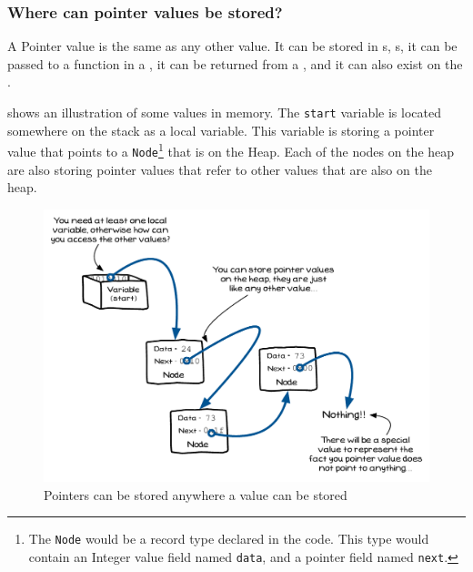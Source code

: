 
\clearpage
\subsubsection{Where can pointer values be stored?} %
\label{ssub:where_can_pointer_values_be_stored_}

A Pointer value is the same as any other value. It can be stored in s, s, it can be passed to a function in a , it can be returned from a , and it can also exist on the .

 shows an illustration of some values in memory. The \texttt{start} variable is located somewhere on the stack as a local variable.  This variable is storing a pointer value that points to a \texttt{Node}\footnote{The \texttt{Node} would be a record type declared in the code. This type would contain an Integer value field named \texttt{data}, and a pointer field named \texttt{next}.} that is on the Heap. Each of the nodes on the heap are also storing pointer values that refer to other values that are also on the heap.

\begin{figure}[h]
   \centering
   \includegraphics[width=\textwidth]{./topics/dynamic-memory/diagrams/PointerValues} 
   \caption{Pointers can be stored anywhere a value can be stored}
   \label{fig:pointer-values}
\end{figure}



